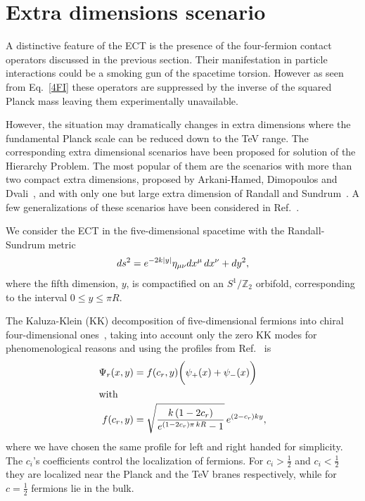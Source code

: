 \documentclass[twocolumn,showpacs,showkeys,prd,superscriptaddress]{revtex4-1}
\begin{document}
\section{\label{sec:extradim}Extra dimensions scenario}



A distinctive feature of the ECT is the presence of the four-fermion contact operators discussed in the previous section.  Their manifestation in particle interactions  could be a smoking gun of the spacetime torsion. However as seen from Eq.~\eqref{4FI} these operators are  suppressed  by the inverse of the squared Planck mass leaving them experimentally unavailable.

However, the situation may dramatically changes in extra dimensions where the fundamental Planck scale can be reduced down to the \si{\TeV} range. The corresponding extra dimensional scenarios have been proposed for solution of the Hierarchy Problem. The most popular of them are the scenarios  with more than two compact extra dimensions, proposed by Arkani-Hamed, Dimopoulos and Dvali~\cite{ArkaniHamed:1998rs,Antoniadis:1998ig,ArkaniHamed:1998nn}, and with only one but large extra dimension of Randall and Sundrum~\cite{Randall:1999ee,Randall:1999vf}. A few generalizations of these scenarios have been considered in Ref.~\cite{DeWolfe:1999cp,Gremm:1999pj,MPS,CastilloFelisola:2004eg}.


We consider the ECT in the five-dimensional spacetime with the Randall-Sundrum metric~\cite{Randall:1999ee}
\begin{align}
  \label{RSmetric}
  ds^2 = e^{-2k\left|y\right|}\eta_{\mu\nu}dx^\mu\,dx^\nu + dy^2,
\end{align}
where the fifth dimension, $y$, is compactified on an  $S^1/\mathbb{Z}_2$ orbifold, corresponding to the interval \mbox{$0\leq y\leq \pi R$}. 


The Kaluza-Klein (KK) decomposition of five-dimensional fermions into chiral four-dimensional ones~\cite{Kehagias:2000au,MPT,CastilloFelisola:2010xh,CastilloFelisola:2012ez}, taking into account only the zero KK modes for phenomenological reasons and using the profiles from Ref.~\cite{Gherghetta:2000qt,Gherghetta:2006ha} is
\begin{align}
  \Psi_r(x,y) &= f(c_r,y)\bigg(\psi_+(x) + \psi_-(x)\bigg)\\
  \intertext{with}
  f(c_r,y) &= \sqrt{\frac{k\left(1-2c_r\right)}{e^{(1-2c_r)\pi\,kR}-1}}\,e^{(2-c_r)ky},
\end{align}
where we have chosen the same profile for left and right handed for simplicity. The $c_i$'s coefficients control the localization of fermions. For $c_i>\tfrac{1}{2}$ and $c_i<\tfrac{1}{2}$ they are localized near the Planck and the \si{\TeV} branes respectively, while for $c=\tfrac{1}{2}$ fermions lie in the bulk.
\end{document}
